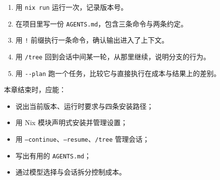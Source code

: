 \begin{enumerate}
  \item 用 \texttt{nix run} 运行一次，记录版本号。
  \item 在项目里写一份 \texttt{AGENTS.md}，包含三条命令与两条约定。
  \item 用 \texttt{!} 前缀执行一条命令，确认输出进入了上下文。
  \item 用 \texttt{/tree} 回到会话中间某一轮，从那里继续，说明分支的行为。
  \item 用 \texttt{-{}-plan} 跑一个任务，比较它与直接执行在成本与结果上的差别。
\end{enumerate}

\begin{checkpoint}
本章结束时，应能：
\begin{itemize}
  \item 说出当前版本、运行时要求与四条安装路径；
  \item 用 Nix 模块声明式安装并管理设置；
  \item 用 \texttt{--continue}、\texttt{--resume}、\texttt{/tree} 管理会话；
  \item 写出有用的 \texttt{AGENTS.md}；
  \item 通过模型选择与会话拆分控制成本。
\end{itemize}
\end{checkpoint}

